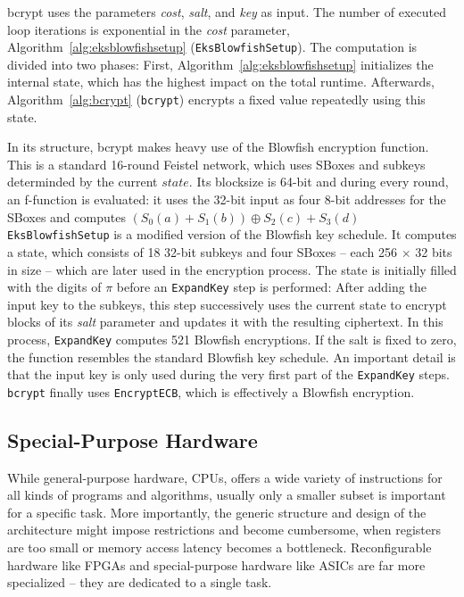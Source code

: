 bcrypt uses the parameters \textit{cost}, \textit{salt}, and \textit{key} as
input. The number of executed loop iterations is exponential in the
\textit{cost} parameter, \cf Algorithm~\ref{alg:eksblowfishsetup}
(\texttt{EksBlowfishSetup}). The computation is divided into two phases: First,
Algorithm~\ref{alg:eksblowfishsetup} initializes the internal state, which has
the highest impact on the total runtime. Afterwards, Algorithm~\ref{alg:bcrypt}
(\texttt{bcrypt}) encrypts a fixed value repeatedly using this state.


In its structure, bcrypt makes heavy use of the Blowfish encryption function.
This is a standard 16-round Feistel network, which uses SBoxes and subkeys
determinded by the current $state$. Its blocksize is 64-bit and during every
round, an f-function is evaluated: it uses the 32-bit input as four 8-bit
addresses for the SBoxes and computes $(S_0(a) + S_1(b)) \oplus S_2(c) + S_3(d)$
%
\texttt{EksBlowfishSetup} is a modified version of the Blowfish key schedule. It
computes a state, which consists of 18 32-bit subkeys and four SBoxes -- each
256 $\times$ 32 bits in size -- which are later used in the encryption process.
The state is initially filled with the digits of $\pi$ before an
\texttt{ExpandKey} step is performed: After adding the input key to the subkeys,
this step successively uses the current state to encrypt blocks of its
\textit{salt} parameter and updates it with the resulting ciphertext. In this
process, \texttt{ExpandKey} computes 521 Blowfish encryptions. If the salt is
fixed to zero, the function resembles the standard Blowfish key schedule. An
important detail is that the input key is only used during the very first part
of the \texttt{ExpandKey} steps. \texttt{bcrypt} finally uses
\texttt{EncryptECB}, which is effectively a Blowfish encryption.

\subsection{Special-Purpose Hardware}
\label{sec:special-hardware}

While general-purpose hardware, \ie CPUs, offers a wide variety of instructions
for all kinds of programs and algorithms, usually only a smaller subset is
important for a specific task. More importantly, the generic structure and
design of the architecture might impose restrictions and become cumbersome, \ie
when registers are too small or memory access latency becomes a bottleneck.
Reconfigurable hardware like FPGAs and special-purpose hardware like ASICs are
far more specialized -- they are dedicated to a single task.

